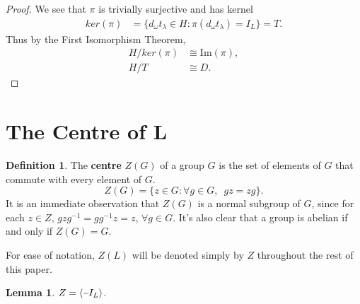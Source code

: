 \documentclass[a4paper , 11pt]{book}
\newcommand{\minus}{\scalebox{0.75}[1.0]{$-$}}
\newtheorem{lemma}[theorem]{Lemma}
\theoremstyle{definition}
\newtheorem*{definition-non}{Definition}
\theoremstyle{remark}
\begin{document}
\begin{proof}
We see that $\pi$ is trivially surjective and has kernel
\begin{align*}  ker(\pi) &= \{ d_\omega t_\lambda \in H : \pi(d_\omega t_\lambda) = I_L \} = T.
\end{align*}
Thus by the First Isomorphism Theorem,
\begin{align*} H / ker(\pi) &\cong \text{Im}(\pi), \\
H / T &\cong D.
\end{align*}

\end{proof}

\section[The Centre of $L$]{The Centre of $\pmb{L}$}

\begin{definition-non}
The \textbf{centre} $Z(G)$ of a group $G$ is the set of elements of  $G$ that commute with every element of $G$.
\begin {equation*} Z(G) = \{ z \in G : \forall g \in G, \hspace{6pt} gz=zg \}. \end{equation*}
It is an immediate observation that $Z(G)$ is a normal subgroup of $G$, since for each $z \in Z$, $gzg^{-1} = gg^{-1}z = z$, $\forall g \in G$. It's also clear that a group is abelian if and only if $Z(G)=G$.

\end{definition-non}

For ease of notation, $Z(L)$ will be denoted simply by $Z$ throughout the rest of this paper.

\begin{lemma}\label{6.2}
$Z = \langle \minus I_L \rangle$.
\end{lemma}
\end{document}
